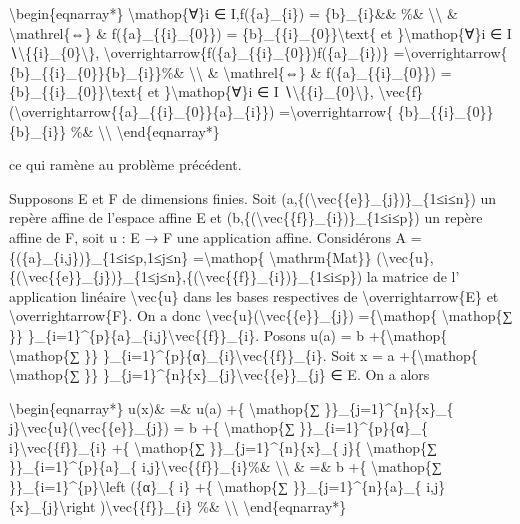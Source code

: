 \documentclass[]{article}
\begin{document}
\textbackslash{}begin\{eqnarray*\} \textbackslash{}mathop\{∀\}i ∈
I,f(\{a\}\_\{i\}) = \{b\}\_\{i\}\&\& \%\&
\textbackslash{}\textbackslash{} \& \textbackslash{}mathrel\{⇔\} \&
f(\{a\}\_\{\{i\}\_\{0\}\}) =
\{b\}\_\{\{i\}\_\{0\}\}\textbackslash{}text\{ et
\}\textbackslash{}mathop\{∀\}i ∈ I
∖\textbackslash{}\{\{i\}\_\{0\}\textbackslash{}\},
\textbackslash{}overrightarrow\{f(\{a\}\_\{\{i\}\_\{0\}\})f(\{a\}\_\{i\})\}
=\textbackslash{}overrightarrow\{
\{b\}\_\{\{i\}\_\{0\}\}\{b\}\_\{i\}\}\%\&
\textbackslash{}\textbackslash{} \& \textbackslash{}mathrel\{⇔\} \&
f(\{a\}\_\{\{i\}\_\{0\}\}) =
\{b\}\_\{\{i\}\_\{0\}\}\textbackslash{}text\{ et
\}\textbackslash{}mathop\{∀\}i ∈ I
∖\textbackslash{}\{\{i\}\_\{0\}\textbackslash{}\},
\textbackslash{}vec\{f\}(\textbackslash{}overrightarrow\{\{a\}\_\{\{i\}\_\{0\}\}\{a\}\_\{i\}\})
=\textbackslash{}overrightarrow\{ \{b\}\_\{\{i\}\_\{0\}\}\{b\}\_\{i\}\}
\%\& \textbackslash{}\textbackslash{} \textbackslash{}end\{eqnarray*\}

ce qui ramène au problème précédent.

Supposons E et F de dimensions finies. Soit
(a,\{(\textbackslash{}vec\{\{e\}\}\_\{j\})\}\_\{1≤i≤n\}) un repère
affine de l'espace affine E et
(b,\{(\textbackslash{}vec\{\{f\}\}\_\{i\})\}\_\{1≤i≤p\}) un repère
affine de F, soit u : E → F une application affine. Considérons A =
\{(\{a\}\_\{i,j\})\}\_\{1≤i≤p,1≤j≤n\} =\textbackslash{}mathop\{
\textbackslash{}mathrm\{Mat\}\}
(\textbackslash{}vec\{u\},\{(\textbackslash{}vec\{\{e\}\}\_\{j\})\}\_\{1≤j≤n\},\{(\textbackslash{}vec\{\{f\}\}\_\{i\})\}\_\{1≤i≤p\})
la matrice de l' application linéaire \textbackslash{}vec\{u\} dans les
bases respectives de \textbackslash{}overrightarrow\{E\} et
\textbackslash{}overrightarrow\{F\}. On a donc
\textbackslash{}vec\{u\}(\textbackslash{}vec\{\{e\}\}\_\{j\})
=\{\textbackslash{}mathop\{ \textbackslash{}mathop\{∑ \}\}
\}\_\{i=1\}\^{}\{p\}\{a\}\_\{i,j\}\textbackslash{}vec\{\{f\}\}\_\{i\}.
Posons u(a) = b +\{\textbackslash{}mathop\{ \textbackslash{}mathop\{∑
\}\}
\}\_\{i=1\}\^{}\{p\}\{α\}\_\{i\}\textbackslash{}vec\{\{f\}\}\_\{i\}.
Soit x = a +\{\textbackslash{}mathop\{ \textbackslash{}mathop\{∑ \}\}
\}\_\{j=1\}\^{}\{n\}\{x\}\_\{j\}\textbackslash{}vec\{\{e\}\}\_\{j\} ∈ E.
On a alors

\textbackslash{}begin\{eqnarray*\} u(x)\& =\& u(a) +\{
\textbackslash{}mathop\{∑ \}\}\_\{j=1\}\^{}\{n\}\{x\}\_\{
j\}\textbackslash{}vec\{u\}(\textbackslash{}vec\{\{e\}\}\_\{j\}) = b +\{
\textbackslash{}mathop\{∑ \}\}\_\{i=1\}\^{}\{p\}\{α\}\_\{
i\}\textbackslash{}vec\{\{f\}\}\_\{i\} +\{ \textbackslash{}mathop\{∑
\}\}\_\{j=1\}\^{}\{n\}\{x\}\_\{ j\}\{ \textbackslash{}mathop\{∑
\}\}\_\{i=1\}\^{}\{p\}\{a\}\_\{
i,j\}\textbackslash{}vec\{\{f\}\}\_\{i\}\%\&
\textbackslash{}\textbackslash{} \& =\& b +\{ \textbackslash{}mathop\{∑
\}\}\_\{i=1\}\^{}\{p\}\textbackslash{}left (\{α\}\_\{ i\} +\{
\textbackslash{}mathop\{∑ \}\}\_\{j=1\}\^{}\{n\}\{a\}\_\{
i,j\}\{x\}\_\{j\}\textbackslash{}right
)\textbackslash{}vec\{\{f\}\}\_\{i\} \%\&
\textbackslash{}\textbackslash{} \textbackslash{}end\{eqnarray*\}
\end{document}
